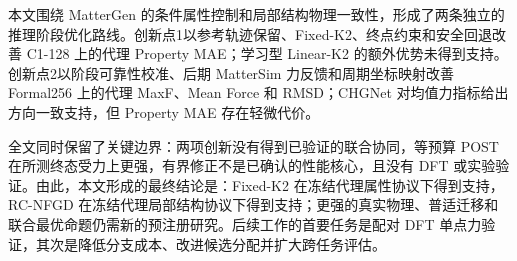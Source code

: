 本文围绕 MatterGen 的条件属性控制和局部结构物理一致性，形成了两条独立的推理阶段优化路线。创新点1以参考轨迹保留、Fixed-K2、终点约束和安全回退改善 C1-128 上的代理 Property MAE；学习型 Linear-K2 的额外优势未得到支持。创新点2以阶段可靠性校准、后期 Matter\allowbreak Sim 力反馈和周期坐标映射改善 Formal256 上的代理 MaxF、Mean Force 和 RMSD；CHGNet 对均值力指标给出方向一致支持，但 Property MAE 存在轻微代价。

全文同时保留了关键边界：两项创新没有得到已验证的联合协同，等预算 POST 在所测终态受力上更强，有界修正不是已确认的性能核心，且没有 DFT 或实验验证。由此，本文形成的最终结论是：Fixed-K2 在冻结代理属性协议下得到支持，RC-NFGD 在冻结代理局部结构协议下得到支持；更强的真实物理、普适迁移和联合最优命题仍需新的预注册研究。后续工作的首要任务是配对 DFT 单点力验证，其次是降低分支成本、改进候选分配并扩大跨任务评估。
